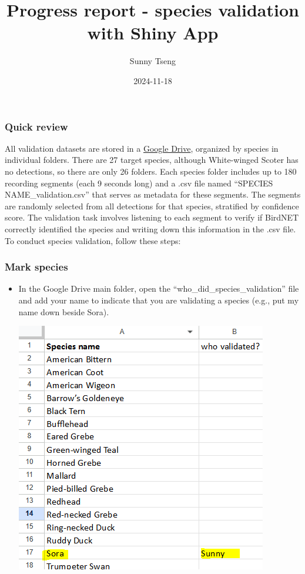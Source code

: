 \documentclass[
]{article}
\title{Progress report - species validation with Shiny App}
\author{Sunny Tseng}
\date{2024-11-18}
\begin{document}
\maketitle

\subsubsection{Quick review}\label{quick-review}

All validation datasets are stored in a
\href{https://drive.google.com/drive/folders/1-oZjQ5xzwJOD9E9hcm_CSMku05FS9gKa?usp=sharing}{Google
Drive}, organized by species in individual folders. There are 27 target
species, although White-winged Scoter has no detections, so there are
only 26 folders. Each species folder includes up to 180 recording
segments (each 9 seconds long) and a .csv file named ``SPECIES
NAME\_validation.csv'' that serves as metadata for these segments. The
segments are randomly selected from all detections for that species,
stratified by confidence score. The validation task involves listening
to each segment to verify if BirdNET correctly identified the species
and writing down this information in the .csv file. To conduct species
validation, follow these steps:

\subsubsection{Mark species}\label{mark-species}

\begin{itemize}
\item
  In the Google Drive main folder, open the
  ``who\_did\_species\_validation'' file and add your name to indicate
  that you are validating a species (e.g., put my name down beside
  Sora).

  \includegraphics{images/clipboard-1502569650.png}
\end{itemize}
\end{document}
